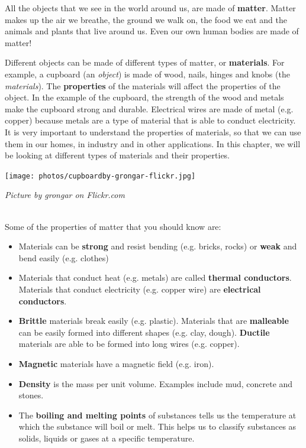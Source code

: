             \label{m38708*id62175}All the objects that we see in the world around us, are made of \textbf{matter}. Matter makes up the air we breathe, the ground we walk on, the food we eat and the animals and plants that live around us. Even our own human bodies are made of matter!\par 
\begin{minipage}{.5\textwidth}
      \label{m38708*id62185}Different objects can be made of different types of matter, or \textbf{materials}. For example, a cupboard (an \textsl{object}) is made of wood, nails, hinges and knobs (the \textsl{materials}). The \textbf{properties} of the materials will affect the properties of the object. In the example of the cupboard, the strength of the wood and metals make the cupboard strong and durable. Electrical wires are made of metal (e.g. copper) because metals are a type of material that is able to conduct electricity. It is very important to understand the properties of materials, so that we can use them in our homes, in industry and in other applications. In this chapter, we will be looking at different types of materials and their properties.\par 
\end{minipage}
\begin{minipage}{.5\textwidth}
\begin{center}
 \texttt{[image: photos/cupboardby-grongar-flickr.jpg]}\par
\textit{Picture by grongar on Flickr.com}
\end{center}
\end{minipage} \\
\label{m38708*id0132}Some of the properties of matter that you should know are:
\label{m38708*lid825}\begin{itemize}[noitemsep]
  \item Materials can be \textbf{strong} and resist bending (e.g. bricks, rocks) or \textbf{weak} and bend easily (e.g. clothes)
  \item Materials that conduct heat (e.g. metals) are called \textbf{thermal conductors}. Materials that conduct electricity (e.g. copper wire) are \textbf{electrical conductors}.
  \item \textbf{Brittle} materials break easily (e.g. plastic). Materials that are \textbf{malleable} can be easily formed into different shapes (e.g. clay, dough). \textbf{Ductile} materials are able to be formed into long wires (e.g. copper).
  \item \textbf{Magnetic} materials have a magnetic field (e.g. iron).
  \item \textbf{Density} is the mass per unit volume. Examples include mud, concrete and stones.
  \item The \textbf{boiling and melting points} of substances tells us the temperature at which the substance will boil or melt. This helps us to classify substances as solids, liquids or gases at a specific temperature.\end{itemize}
